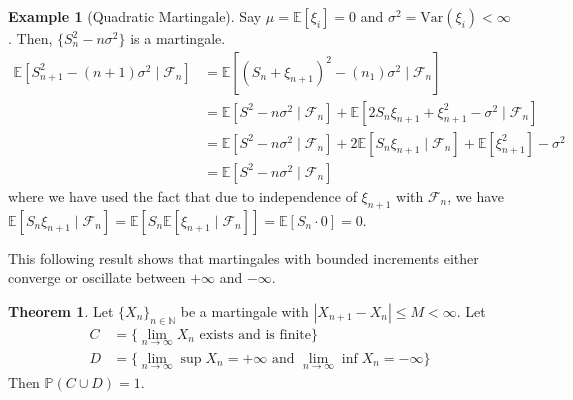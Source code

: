 \documentclass{article}
\theoremstyle{definition}
\newtheorem{theorem}{Theorem}[section]
\newtheorem{example}{Example}[section]
\theoremstyle{remark}
\theoremstyle{definition}
\begin{document}
\begin{example}[Quadratic Martingale]
Say $\mu = \mathbb{E}[\xi_i] = 0$ and $\sigma^2 = \mathrm{Var}(\xi_i) < \infty$. Then, $\{S_n^2 - n \sigma^2\}$ is a martingale. 
\begin{align*}
    \mathbb{E}[S_{n+1}^2 - (n + 1) \sigma^2 \mid \mathcal{F}_n] & = \mathbb{E}[ (S_n + \xi_{n+1})^2 - (n _ 1) \sigma^2 \mid \mathcal{F}_n] \\
    & = \mathbb{E}[S^2 - n \sigma^2 \mid \mathcal{F}_n ] + \mathbb{E}[ 2 S_n \xi_{n+1} + \xi_{n+1}^2 - \sigma^2 \mid \mathcal{F}_n] \\
    & = \mathbb{E}[S^2 - n \sigma^2 \mid \mathcal{F}_n ] + 2 \mathbb{E}[ S_n \xi_{n+1} \mid \mathcal{F}_n ] + \mathbb{E}[\xi_{n+1}^2] - \sigma^2  \\
    & = \mathbb{E}[S^2 - n \sigma^2 \mid \mathcal{F}_n ]
\end{align*}
where we have used the fact that due to independence of $\xi_{n+1}$ with $\mathcal{F}_n$, we have $\mathbb{E}[S_n \xi_{n+1} \mid \mathcal{F}_n] = \mathbb{E}[S_n \mathbb{E}[ \xi_{n+1} \mid \mathcal{F}_n]] = \mathbb{E}[S_n \cdot 0] = 0$. 
\end{example}

This following result shows that martingales with bounded increments either converge or oscillate between $+\infty$ and $-\infty$. 

\begin{theorem}
Let $\{X_n\}_{n \in \mathbb{N}}$ be a martingale with $|X_{n+1} - X_n| \leq M < \infty$. Let 
\begin{align*}
    C & = \{\lim_{n \rightarrow \infty} X_n \text{ exists and is finite}\} \\
    D & = \{\lim_{n \rightarrow \infty} \sup X_n = +\infty \text{ and } \lim_{n \rightarrow \infty} \inf X_n = -\infty\}
\end{align*}
Then $\mathbb{P}(C \cup D) = 1$. 
\end{theorem}
\end{document}
